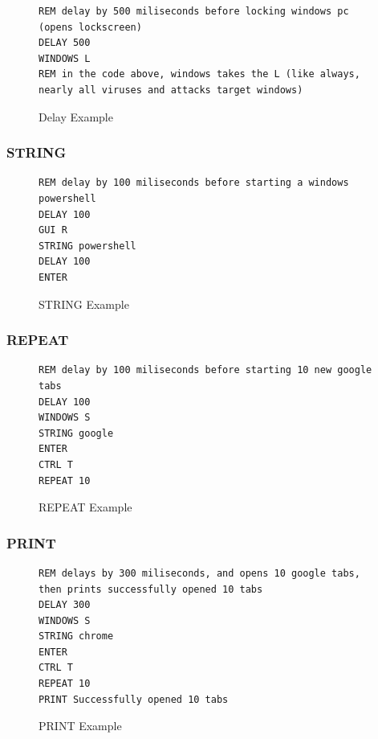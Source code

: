 \documentclass[a4paper,12pt]{article}
\begin{document}
\begin{figure}[htb]
\begin{small}
\begin{lstlisting}[language=Ducky]
REM delay by 500 miliseconds before locking windows pc (opens lockscreen)
DELAY 500
WINDOWS L
REM in the code above, windows takes the L (like always, nearly all viruses and attacks target windows)
\end{lstlisting}
\end{small}
\caption{Delay Example}
\end{figure}

\subsubsection{STRING}

\begin{figure}[htb]
\begin{small}
\begin{lstlisting}[language=Ducky]
REM delay by 100 miliseconds before starting a windows powershell
DELAY 100
GUI R
STRING powershell
DELAY 100
ENTER
\end{lstlisting}
\end{small}
\caption{STRING Example}
\end{figure}

\subsubsection{REPEAT}

\begin{figure}[htb]
\begin{small}
\begin{lstlisting}[language=Ducky]
REM delay by 100 miliseconds before starting 10 new google tabs
DELAY 100
WINDOWS S
STRING google
ENTER
CTRL T
REPEAT 10
\end{lstlisting}
\end{small}
\caption{REPEAT Example}
\end{figure}

\subsubsection{PRINT}

\begin{figure}[htb]
\begin{small}
\begin{lstlisting}[language=Ducky]
REM delays by 300 miliseconds, and opens 10 google tabs, then prints successfully opened 10 tabs
DELAY 300
WINDOWS S
STRING chrome
ENTER
CTRL T
REPEAT 10
PRINT Successfully opened 10 tabs
\end{lstlisting}
\end{small}
\caption{PRINT Example}
\end{figure}
\end{document}
